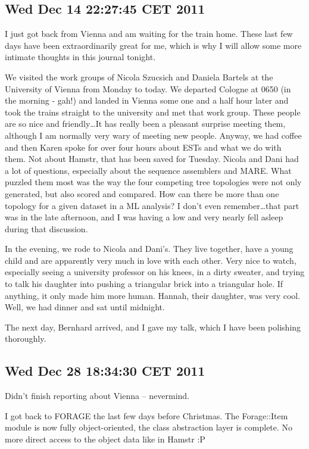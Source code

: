 \subsection*{Wed Dec 14 22:27:45 CET 2011}

I just got back from Vienna and am waiting for the train home. These last few
days have been extraordinarily great for me, which is why I will allow some more
intimate thoughts in this journal tonight. 

We visited the work groups of Nicola Szucsich and Daniela Bartels at the
University of Vienna from Monday to today. We departed Cologne at 0650 (in the
morning - gah!) and landed in Vienna some one and a half hour later and took the
trains straight to the university and met that work group. These people are so
nice and friendly\ldots It has really been a pleasant surprise meeting them,
although I am normally very wary of meeting new people. Anyway, we had coffee
and then Karen spoke for over four hours about ESTs and what we do with them.
Not about Hamstr, that has been saved for Tuesday. Nicola and Dani had a lot of
questions, especially about the sequence assemblers and MARE. What puzzled them
most was the way the four competing tree topologies were not only generated, but
also scored and compared. How can there be more than one topology for a given
dataset in a ML analysis? I don't even remember\ldots that part was in the late
afternoon, and I was having a low and very nearly fell asleep during that
discussion.

In the evening, we rode to Nicola and Dani's. They live together, have a young
child and are apparently very much in love with each other. Very nice to watch,
especially seeing a university professor on his knees, in a dirty sweater, and
trying to talk his daughter into pushing a triangular brick into a triangular
hole. If anything, it only made him more human. Hannah, their daughter, was very
cool. Well, we had dinner and sat until midnight.

The next day, Bernhard arrived, and I gave my talk, which I have been polishing
thoroughly. 

\subsection*{Wed Dec 28 18:34:30 CET 2011}

Didn't finish reporting about Vienna -- nevermind. 

I got back to FORAGE the last few days before Christmas. The Forage::Item module
is now fully object-oriented, the class abstraction layer is complete. No more
direct access to the object data like in Hamstr :P 

